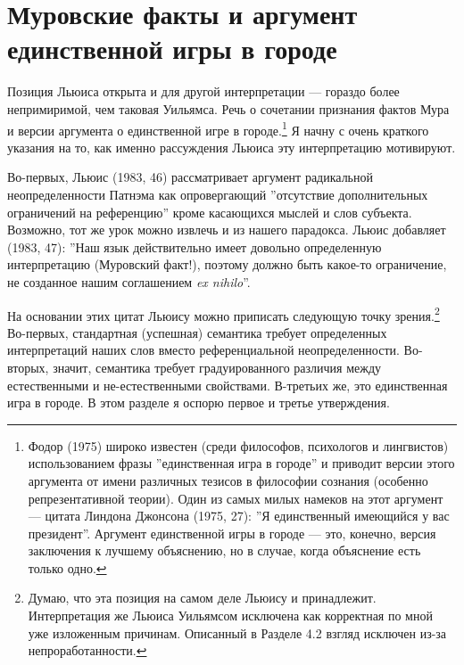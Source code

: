 \documentclass[11pt]{book}
\begin{document}
\section{Муровские факты и аргумент единственной игры в городе}

Позиция Льюиса открыта и для другой интерпретации --- гораздо более непримиримой, чем таковая Уильямса. Речь о сочетании признания фактов Мура и версии аргумента о единственной игре в городе.\footnote{Фодор (1975) широко известен (среди философов, психологов и лингвистов) использованием фразы ''единственная игра в городе'' и приводит версии этого аргумента от имени различных тезисов в философии сознания (особенно репрезентативной теории). Один из самых милых намеков на этот аргумент --- цитата Линдона Джонсона (1975, 27): ''Я единственный имеющийся у вас президент''. Аргумент единственной игры в городе --- это, конечно, версия заключения к лучшему объяснению, но в случае, когда объяснение есть только одно.} Я начну с очень краткого указания на то, как именно рассуждения Льюиса эту интерпретацию мотивируют.

Во-первых, Льюис (1983, 46) рассматривает аргумент радикальной неопределенности Патнэма как опровергающий ''отсутствие дополнительных ограничений на референцию'' кроме касающихся мыслей и слов субъекта. Возможно, тот же урок можно извлечь и из нашего парадокса. Льюис добавляет (1983, 47): ''Наш язык действительно имеет довольно определенную интерпретацию (Муровский факт!), поэтому должно быть какое-то ограничение, не созданное нашим соглашением \textit{ex nihilo}''.

На основании этих цитат Льюису можно приписать следующую точку зрения.\footnote{Думаю, что эта позиция на самом деле Льюису и принадлежит. Интерпретация же Льюиса Уильямсом исключена как корректная по мной уже изложенным причинам. Описанный в Разделе 4.2 взгляд исключен из-за непроработанности.} Во-первых, стандартная (успешная) семантика требует определенных интерпретаций наших слов вместо референциальной неопределенности. Во-вторых, значит, семантика требует градуированного различия между естественными и не-естественными свойствами. В-третьих же, это единственная игра в городе. В этом разделе я оспорю первое и третье утверждения.
\end{document}
